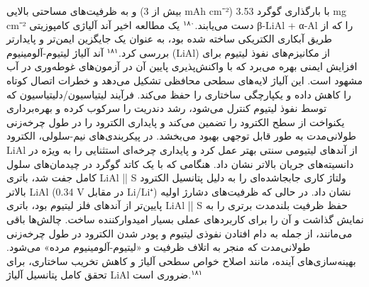\documentclass[12pt,a4paper,twocolumn]{article} %
\newcommand{\persian}[1]{\textfarsi{#1}}
\newcommand{\english}[1]{\textenglish{#1}}
\begin{document}

\persian{
و به ظرفیت‌های مساحتی بالایی (بیش از \english{3 mAh cm⁻²}) با بارگذاری گوگرد \english{3.53 mg cm⁻²} دست می‌یابند.$^{۱۸۰}$
}
\persian{
یک مطالعه اخیر آند آلیاژی کامپوزیتی \english{β-LiAl + α-Al} را که از طریق آبکاری الکتریکی ساخته شده بود، به عنوان یک جایگزین ایمن‌تر و پایدارتر بررسی کرد.$^{۱۸۱}$ آند آلیاژ لیتیوم-آلومینیوم (\english{LiAl}) از مکانیزم‌های نفوذ لیتیوم برای افزایش ایمنی بهره می‌برد که با واکنش‌پذیری پایین آن در آزمون‌های غوطه‌وری در آب مشهود است. این آلیاژ لایه‌های سطحی محافظی تشکیل می‌دهد و خطرات اتصال کوتاه را کاهش داده و یکپارچگی ساختاری را حفظ می‌کند. فرآیند لیتیاسیون/دلیتیاسیون که توسط نفوذ لیتیوم کنترل می‌شود، رشد دندریت را سرکوب کرده و بهره‌برداری یکنواخت از سطح الکترود را تضمین می‌کند و پایداری الکترود را در طول چرخه‌زنی طولانی‌مدت به طور قابل توجهی بهبود می‌بخشد. در پیکربندی‌های نیم-سلولی، الکترود \english{LiAl} از آندهای لیتیومی سنتی بهتر عمل کرد و پایداری چرخه‌ای استثنایی را به ویژه در دانسیته‌های جریان بالاتر نشان داد. هنگامی که با یک کاتد گوگرد در چیدمان‌های سلول کامل جفت شد، باتری \english{LiAl || S} ولتاژ کاری جابجاشده‌ای را به دلیل پتانسیل الکترود بالاتر \english{LiAl} (\english{0.34 V} در مقابل \english{Li/Li⁺}) نشان داد. در حالی که ظرفیت‌های دشارژ اولیه پایین‌تر از آندهای فلز لیتیوم بود، باتری \english{LiAl || S} حفظ ظرفیت بلندمدت برتری را به نمایش گذاشت و آن را برای کاربردهای عملی بسیار امیدوارکننده ساخت. چالش‌ها باقی می‌مانند، از جمله به دام افتادن نفوذی لیتیوم و پودر شدن الکترود در طول چرخه‌زنی طولانی‌مدت که منجر به اتلاف ظرفیت و «لیتیوم-آلومینیوم مرده» می‌شود. بهینه‌سازی‌های آینده، مانند اصلاح خواص سطحی آلیاژ و کاهش تخریب ساختاری، برای تحقق کامل پتانسیل آلیاژ \english{LiAl} ضروری است.$^{۱۸۱}$
}
\end{document}
